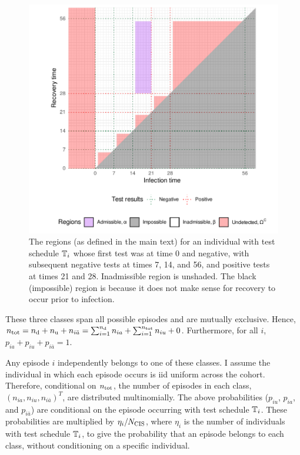\documentclass[thesis.tex]{subfiles}
\begin{document}
\begin{figure}
\includegraphics[width=\textwidth]{cis-perfect-testing/regions_diag}
\caption[Admissible, inadmissible, and undetected infections]{The regions (as defined in the main text) for an individual with test schedule $\mathbb{T}_i$ whose first test was at time 0 and negative, with subsequent
negative tests at times 7, 14, and 56, and positive tests at times 21
and 28. Inadmissible region is unshaded. The black (impossible) region is because it does not make sense for recovery to occur prior to infection. \label{perf-test:fig:partitionSpace}}
\end{figure}

These three classes span all possible episodes and are mutually exclusive.
Hence, $n_\text{tot} = n_\text{d} + n_\text{u} + n_{i\bar{a}} = \sum_{i=1}^{n_\text{d}} n_{ia} + \sum_{i=1}^{n_\text{tot}} n_{iu} + 0$.
Furthermore, for all $i$, $p_{ia} + p_{iu} + p_{i\bar{a}} = 1$.

Any episode $i$ independently belongs to one of these classes.
I assume the individual in which each episode occurs is iid uniform across the cohort.
Therefore, conditional on $n_\text{tot}$, the number of episodes in each class, $(n_{ia}, n_{iu}, n_{i\bar{a}})^T$, are distributed multinomially.
The above probabilities ($p_{iu}$, $p_{ia}$, and $p_{i\bar{a}}$) are conditional on the episode occurring with test schedule $\mathbb{T}_i$.
These probabilities are multiplied by $\eta_i/N_\text{CIS}$, where $\eta_i$ is the number of individuals with test schedule $\mathbb{T}_i$, to give the probability that an episode belongs to each class, without conditioning on a specific individual.
\end{document}

